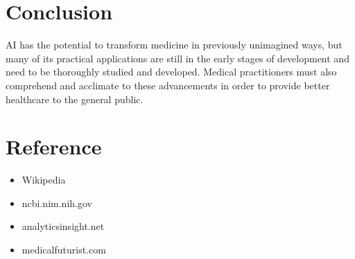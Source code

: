 \documentclass[12pt]{article}
\begin{document}
\section{Conclusion}
AI has the potential to transform medicine in previously unimagined ways, but many of its practical applications are still in the early stages of development and need to be thoroughly studied and developed. Medical practitioners must also comprehend and acclimate to these advancements in order to provide better healthcare to the general public.


\section{Reference}

\begin{itemize}
\item Wikipedia
\item ncbi.nim.nih.gov
\item analyticsinsight.net
\item medicalfuturist.com
\end{itemize}
\end{document}
